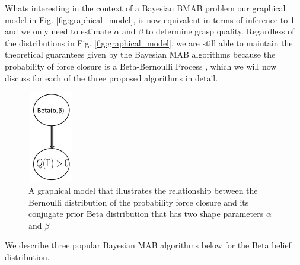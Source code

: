 \documentclass[journal,transmag]{IEEEtran}%
\begin{document}
Whats interesting in the context of a Bayesian BMAB problem our graphical model in Fig. \ref{fig:graphical_model}, is now equivalent in terms of inference to \ref{fig:beta_model} and we only need to estimate $\alpha$ and $\beta$ to determine grasp quality. Regardless of the distributions in Fig. \ref{fig:graphical_model}, we are still able to maintain the theoretical guarantees given by the Bayesian MAB algorithms because the probability of force closure is a Beta-Bernoulli Process \cite{agrawal2011analysis} \cite{kaufmann2012bayesian} 
\cite{weber1992gittins}, which we will now discuss for each of the three proposed algorithms in detail. 


\begin{figure}[ht!]
\centering
\includegraphics[width = 2cm, height = 4cm]{figures/Slide9.jpg}
\caption{A graphical model that illustrates the relationship between the Bernoulli distribution of the probability force closure and its conjugate prior Beta distribution that has two shape parameters $\alpha$ and $\beta$ }
\vspace*{-10pt}
\label{fig:beta_model}
\end{figure}




We describe three popular Bayesian MAB algorithms below for the Beta belief distribution.

\end{document}

